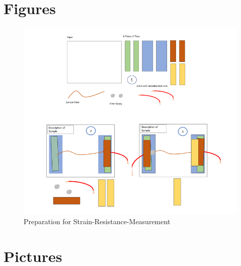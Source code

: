 \begin{appendices}
\label{sec:Appendix}



\section{Figures}
\label{appendix:fig}

\begin{figure}[hb!]
    \centering
    \includegraphics[width=.8\textwidth]{./pic/Meas_Prep_Together.PNG}
    \caption{Preparation for 
Strain-Resistance-Measurement}
    \label{fig:MeasPrep}
\end{figure}

\section{Pictures}



\end{appendices}

